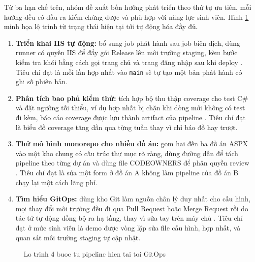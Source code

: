 Từ ba hạn chế trên, nhóm đề xuất bốn hướng phát triển theo thứ tự ưu tiên, mỗi hướng đều có đầu ra kiểm chứng được và phù hợp với năng lực sinh viên.
Hình \ref{fig:c8-roadmap} minh họa lộ trình từ trạng thái hiện tại tới tự động hóa đầy đủ.

\begin{enumerate}
\item \textbf{Triển khai IIS tự động:} bổ sung job phát hành sau job biên dịch, dùng runner có quyền IIS để đẩy gói Release lên môi trường staging, kèm bước kiểm tra khói bằng cách gọi trang chủ và trang đăng nhập sau khi deploy \cite{ghactions,gitlabci,msmsbuild}.
Tiêu chí đạt là mỗi lần hợp nhất vào \texttt{main} sẽ tự tạo một bản phát hành có ghi số phiên bản.
\item \textbf{Phân tích bao phủ kiểm thử:} tích hợp bộ thu thập coverage cho test C\# và đặt ngưỡng tối thiểu, ví dụ hợp nhất bị chặn khi dòng mới không có test đi kèm, báo cáo coverage được lưu thành artifact của pipeline \cite{githubdocs,gitlabdocs}.
Tiêu chí đạt là biểu đồ coverage tăng dần qua từng tuần thay vì chỉ báo đỗ hay trượt.
\item \textbf{Thử mô hình monorepo cho nhiều đồ án:} gom hai đến ba đồ án ASPX vào một kho chung có cấu trúc thư mục rõ ràng, dùng đường dẫn để tách pipeline theo từng dự án và dùng file CODEOWNERS để phân quyền review \cite{githubdocs,atlassiangit}.
Tiêu chí đạt là sửa một form ở đồ án A không làm pipeline của đồ án B chạy lại một cách lãng phí.
\item \textbf{Tìm hiểu GitOps:} dùng kho Git làm nguồn chân lý duy nhất cho cấu hình, mọi thay đổi môi trường đều đi qua Pull Request hoặc Merge Request rồi do tác tử tự động đồng bộ ra hạ tầng, thay vì sửa tay trên máy chủ \cite{progit,gitlabdocs,ghactions}.
Tiêu chí đạt ở mức sinh viên là demo được vòng lặp sửa file cấu hình, hợp nhất, và quan sát môi trường staging tự cập nhật.
\end{enumerate}

\begin{figure}[H]
\centering
{}
\caption{Lo trinh 4 buoc tu pipeline hien tai toi GitOps}
\label{fig:c8-roadmap}
\end{figure}

